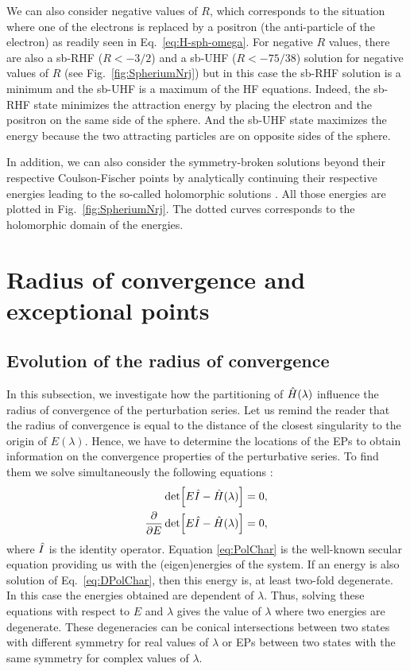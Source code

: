 \documentclass[11pt,a4paper]{article}
\newcommand{\hH}{\Hat{H}}
\newcommand{\hI}{\Hat{I}}
\begin{document}
We can also consider negative values of $R$, which corresponds to the situation where one of the electrons is replaced by a positron (the anti-particle of the electron) as readily seen in Eq.~\eqref{eq:H-sph-omega}. For negative $R$ values, there are also a sb-RHF ($R<-3/2$) and a sb-UHF ($R<-75/38$) solution for negative values of $R$ (see Fig.~\ref{fig:SpheriumNrj}) but in this case the sb-RHF solution is a minimum and the sb-UHF is a maximum of the HF equations. Indeed, the sb-RHF state minimizes the attraction energy by placing the electron and the positron on the same side of the sphere. And the sb-UHF state maximizes the energy because the two attracting particles are on opposite sides of the sphere.

In addition, we can also consider the symmetry-broken solutions beyond their respective Coulson-Fischer points by analytically continuing their respective energies leading to the so-called holomorphic solutions \cite{Hiscock_2014, Burton_2019, Burton_2019a}. All those energies are plotted in Fig.~\ref{fig:SpheriumNrj}. The dotted curves corresponds to the holomorphic domain of the energies.


\section{Radius of convergence and exceptional points}

\subsection{Evolution of the radius of convergence}

In this subsection, we investigate how the partitioning of $\hH(\lambda)$ influence the radius of convergence of the perturbation series. Let us remind the reader that the radius of convergence is equal to the distance of the closest singularity to the origin of $E(\lambda)$. Hence, we have to determine the locations of the EPs to obtain information on the convergence properties of the perturbative series. To find them we solve simultaneously the following equations \cite{Cejnar_2007}:
\begin{subequations}
\begin{align}
	\label{eq:PolChar}
	\det[E\hI-\hH(\lambda)] & = 0,
	\\ 
	\label{eq:DPolChar}
	\pdv{E}\det[E\hI-\hH(\lambda)] & = 0,
\end{align}
\end{subequations}
where $\hI$ is the identity operator.
Equation \eqref{eq:PolChar} is the well-known secular equation providing us with the (eigen)energies of the system. If an energy is also solution of Eq.~\eqref{eq:DPolChar}, then this energy is, at least two-fold degenerate. In this case the energies obtained are dependent of $\lambda$. Thus, solving these equations with respect to $E$ and $\lambda$ gives the value of $\lambda$ where two energies are degenerate. These degeneracies can be conical intersections between two states with different symmetry for real values of $\lambda$ \cite{Yarkony_1996} or EPs between two states with the same symmetry for complex values of $\lambda$.
\end{document}
